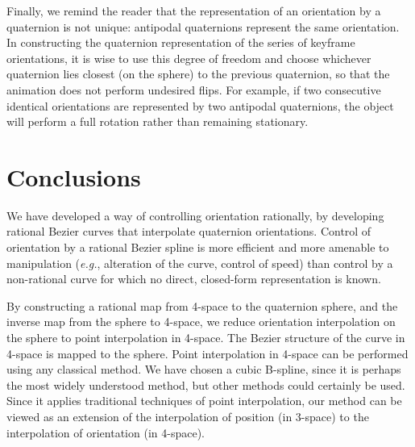 Finally, we remind the reader that the representation of an orientation
by a quaternion is not unique: antipodal quaternions represent the same
orientation. 
In constructing the quaternion representation of the
series of keyframe orientations, 
it is wise to use this degree of freedom and 
choose whichever quaternion lies closest (on the sphere)
to the previous quaternion, so that the animation does not perform
undesired flips.
For example, if two consecutive identical orientations are 
represented by two antipodal quaternions, 
the object will perform a full rotation rather than remaining stationary.


\section{Conclusions}
\label{sec:finito}

We have developed a way of controlling orientation rationally,
by developing rational Bezier curves that interpolate quaternion orientations.
Control of orientation by a rational Bezier spline is more efficient
and more amenable to manipulation ({\em e.g.}, alteration of the curve, control
of speed) than control by a non-rational curve 
for which no direct, closed-form representation is known.

By constructing a rational map from 4-space to the quaternion sphere,
and the inverse map from the sphere to 4-space,
we reduce orientation interpolation on the sphere 
to point interpolation in 4-space.
The Bezier structure of the curve in 4-space is mapped to the sphere.
Point interpolation in 4-space can be performed using any
classical method.
We have chosen a cubic B-spline,
since it is perhaps the most widely understood method,
but other methods could certainly be used.
Since it applies traditional techniques of point interpolation,
our method can be viewed as an extension of the interpolation of position
(in 3-space) to the interpolation of orientation (in 4-space).



